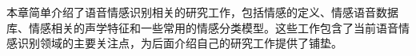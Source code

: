 本章简单介绍了语音情感识别相关的研究工作，包括情感的定义、情感语音数据库、情感相关的声学特征和一些常用的情感分类模型。这些工作包含了当前语音情感识别领域的主要关注点，为后面介绍自己的研究工作提供了铺垫。









